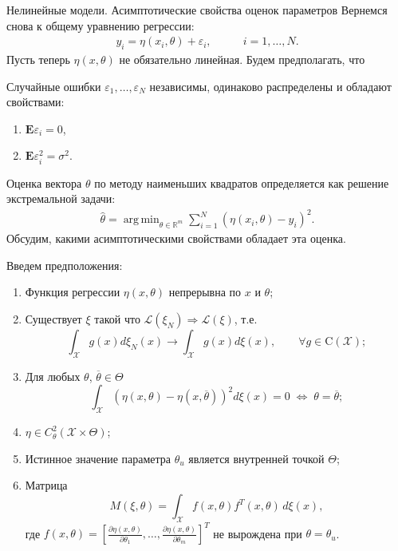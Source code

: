 \documentclass[10pt,slidestop,usepdftitle=false]{beamer}
\DeclareMathOperator*{\argmin}{arg\,min}
\begin{document}
\begin{frame}{Нелинейные модели. Асимптотические свойства оценок параметров}
Вернемся снова к общему уравнению регрессии:
 \begin{align*}
	y_{i} = \eta(x_i,\theta) + \varepsilon_{i}, \qquad &i = 1, \dots, N.
 \end{align*}
 Пусть теперь $\eta(x,\theta)$ не обязательно линейная.
\pause 
 Будем предполагать, что

 Случайные ошибки $\varepsilon_1,\dots,\varepsilon_N$ независимы, одинаково распределены и обладают свойствами:   
 \begin{enumerate}
 \item $\mathbf{E}\varepsilon_i = 0$,\\
 \item $\mathbf{E}\varepsilon_i^2 = \sigma^2$. 
 
 \end{enumerate}
 \pause
Оценка вектора $\theta$ по методу наименьших квадратов определяется как решение экстремальной задачи:
\begin{gather*}
    \widehat\theta = \argmin_{\theta \in \mathbb{R}^m} \sum_{i = 1}^N (\eta(x_i, \theta) - y_i)^2.
\end{gather*}
\pause
Обсудим, какими асимптотическими свойствами обладает эта оценка.
\end{frame}

\begin{frame}
Введем предположения:
\begin{enumerate}
    \item
    Функция регрессии $\eta(x, \theta)$ непрерывна по $x$ и $\theta$;
	\pause
    \item
    Существует $\xi$ такой что $ \mathcal L(\xi_N) \Rightarrow \mathcal L(\xi)$, т.е. 
    $$
        \int_\mathcal X g(x) d\xi_N(x) \rightarrow  \int_\mathcal X g(x) d \xi(x), \qquad \forall g \in \mathrm C(\mathcal X);
    $$

	\pause
    \item Для любых $\theta$, $\overline\theta \in \Theta$
    $$
        \int_\mathcal X \left(\eta(x, \theta) - \eta(x, \overline \theta) \right)^2  d\xi(x) = 0 \; \Leftrightarrow \; \theta = \overline \theta;
    $$

	\pause
    \item
    $\eta \in C_\theta^2(\mathcal X \times \Theta)$;

	\pause
    \item
    Истинное значение параметра $\theta_u$ является внутренней точкой $\Theta$;

	\pause
    \item
    Матрица
    $$
        M(\xi, \theta) = \int_\mathcal X f(x, \theta) f^{T}(x, \theta)\, d\xi(x),
    $$
    где $
    f(x, \theta) = {\left[\frac{\partial \eta(x, \theta)}{\partial \theta_1}, \dots, \frac{\partial \eta(x, \theta)}{\partial \theta_m}\right]}^{T}
    $
    не вырождена при $\theta = \theta_u$.
\end{enumerate}
\end{frame}
\end{document}
